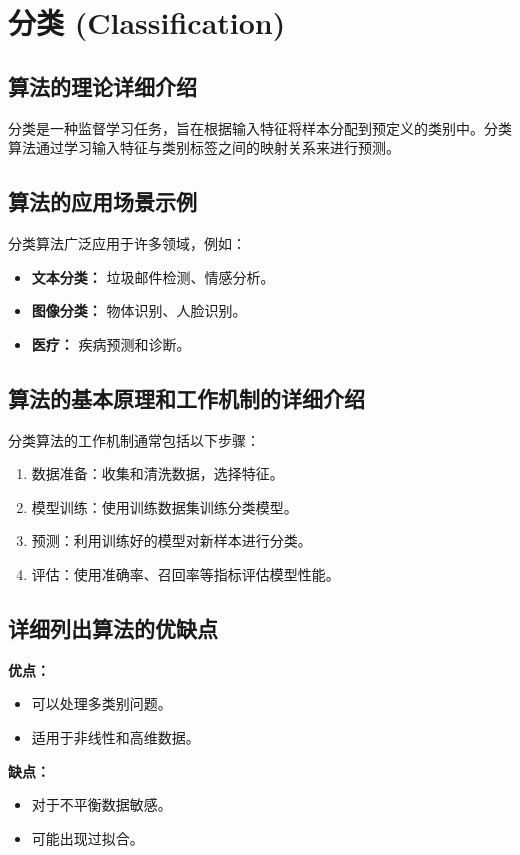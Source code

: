 \section{分类 (Classification)}
\subsection*{算法的理论详细介绍}
分类是一种监督学习任务，旨在根据输入特征将样本分配到预定义的类别中。分类算法通过学习输入特征与类别标签之间的映射关系来进行预测。

\subsection*{算法的应用场景示例}
分类算法广泛应用于许多领域，例如：
\begin{itemize}
    \item \textbf{文本分类：} 垃圾邮件检测、情感分析。
    \item \textbf{图像分类：} 物体识别、人脸识别。
    \item \textbf{医疗：} 疾病预测和诊断。
\end{itemize}

\subsection*{算法的基本原理和工作机制的详细介绍}
分类算法的工作机制通常包括以下步骤：
\begin{enumerate}
    \item 数据准备：收集和清洗数据，选择特征。
    \item 模型训练：使用训练数据集训练分类模型。
    \item 预测：利用训练好的模型对新样本进行分类。
    \item 评估：使用准确率、召回率等指标评估模型性能。
\end{enumerate}

\subsection*{详细列出算法的优缺点}
\textbf{优点：}
\begin{itemize}
    \item 可以处理多类别问题。
    \item 适用于非线性和高维数据。
\end{itemize}

\textbf{缺点：}
\begin{itemize}
    \item 对于不平衡数据敏感。
    \item 可能出现过拟合。
\end{itemize}

